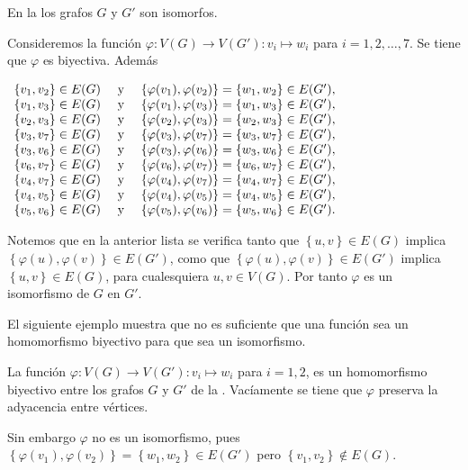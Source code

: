 \begin{Ejm}
   En la  los grafos $G$ y $G'$ son isomorfos. 
   
   Consideremos la función $\varphi:V(G)\to V(G'):v_i\mapsto w_i$ para $i=1,2,\dots ,7$. Se tiene que $\varphi$ es biyectiva. Además
   \begin{center}
   $\hfill
   \begin{array}{rcl}
      \{v_1, v_2\} \in E(G) &\text{ y }& \{\varphi(v_1), \varphi(v_2)\} = \{w_1, w_2\} \in E(G'), \\
      \{v_1, v_3\} \in E(G) &\text{ y }& \{\varphi(v_1), \varphi(v_3)\} = \{w_1, w_3\} \in E(G'), \\
      \{v_2, v_3\} \in E(G) &\text{ y }& \{\varphi(v_2), \varphi(v_3)\} = \{w_2, w_3\} \in E(G'), \\
      \{v_3, v_7\} \in E(G) &\text{ y }& \{\varphi(v_3), \varphi(v_7)\} = \{w_3, w_7\} \in E(G'), \\
      \{v_3, v_6\} \in E(G) &\text{ y }& \{\varphi(v_3), \varphi(v_6)\} = \{w_3, w_6\} \in E(G'), \\
      \{v_6, v_7\} \in E(G) &\text{ y }& \{\varphi(v_6), \varphi(v_7)\} = \{w_6, w_7\} \in E(G'), \\
      \{v_4, v_7\} \in E(G) &\text{ y }& \{\varphi(v_4), \varphi(v_7)\} = \{w_4, w_7\} \in E(G'), \\
      \{v_4, v_5\} \in E(G) &\text{ y }& \{\varphi(v_4), \varphi(v_5)\} = \{w_4, w_5\} \in E(G'), \\
      \{v_5, v_6\} \in E(G) &\text{ y }& \{\varphi(v_5), \varphi(v_6)\} = \{w_5, w_6\} \in E(G').
   \end{array}
   \hfill$
   \end{center}
   Notemos que en la anterior lista se verifica tanto que $\left\lbrace u,v\right\rbrace\in E(G)$ implica $\left\lbrace \varphi(u), \varphi(v) \right\rbrace \allowbreak \in E(G')$, como que $\left\lbrace \varphi(u), \varphi(v)\right\rbrace\in E(G')$ implica $\left\lbrace u,v\right\rbrace\in E(G)$, para cualesquiera $u,v\in V(G)$. Por tanto $\varphi$ es un isomorfismo de $G$ en $G'$.
\end{Ejm}
El siguiente ejemplo muestra que no es suficiente que una función sea un homomorfismo biyectivo para que sea un isomorfismo.
\begin{Ejm}
   La función $\varphi:V(G)\to V(G'):v_i\mapsto w_i$ para $i=1,2$, es un homomorfismo biyectivo entre los grafos $G$ y $G'$ de la . Vacíamente se tiene que $\varphi$ preserva la adyacencia entre vértices.
   
   Sin embargo $\varphi$ no es un isomorfismo, pues $\left\lbrace \varphi(v_1),\varphi(v_2)\right\rbrace=\left\lbrace w_1,w_2\right\rbrace\in E(G')$ pero $\left\lbrace v_1,v_2\right\rbrace\notin E(G)$.
\end{Ejm}
